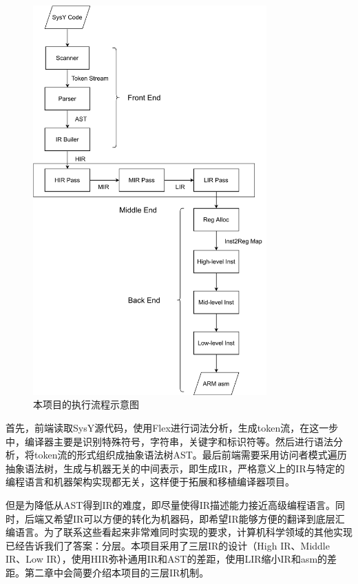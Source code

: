 \begin{figure}[htb]
  \centering
  \includegraphics[width=0.8\textwidth]{figures/flammingmycompiler.pdf}
  \caption{本项目的执行流程示意图}
  \label{fig:compiler}
\end{figure}

首先，前端读取SysY源代码，使用Flex进行词法分析，生成token流，在这一步中，编译器主要是识别特殊符号，字符串，关键字和标识符等。然后进行语法分析，将token流的形式组织成抽象语法树AST。最后前端需要采用访问者模式遍历抽象语法树，生成与机器无关的中间表示，即生成IR，严格意义上的IR与特定的编程语言和机器架构实现都无关，这样便于拓展和移植编译器项目。

但是为降低从AST得到IR的难度，即尽量使得IR描述能力接近高级编程语言。同时，后端又希望IR可以方便的转化为机器码，即希望IR能够方便的翻译到底层汇编语言。为了联系这些看起来非常难同时实现的要求，计算机科学领域的其他实现已经告诉我们了答案：分层。本项目采用了三层IR的设计（High IR、Middle IR、Low IR），使用HIR弥补通用IR和AST的差距，使用LIR缩小IR和asm的差距。第二章中会简要介绍本项目的三层IR机制。

